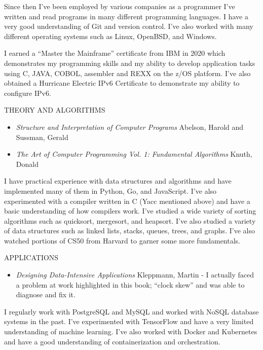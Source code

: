 \documentclass[12pt]{report}
\begin{document}
Since then I've been employed by various companies as a programmer I've written and read programs in many different programming languages. I have a very good understanding of Git and version control. I've also worked with many different operating systems such as Linux, OpenBSD, and Windows.\hfill \break 

I earned a ``Master the Mainframe'' certificate from IBM in 2020 which demonstrates my programming skills and my ability to develop application tasks using C, JAVA, COBOL, assembler and REXX on the z/OS platform. I've also obtained a Hurricane Electric IPv6 Certificate to demonstrate my ability to configure IPv6.\hfill \break

THEORY AND ALGORITHMS
\begin{itemize}
  \item \emph {Structure and Interpretation of Computer Programs} Abelson, Harold and Sussman, Gerald
  \item \emph {The Art of Computer Programming Vol. 1: Fundamental Algorithms} Knuth, Donald
\end{itemize}
I have practical experience with data structures and algorithms and have implemented many of them in Python, Go, and JavaScript. I've also experimented  with a compiler written in C (Yacc mentioned above) and have a basic understanding of how compilers work. I've studied a wide variety of sorting algorithms such as quicksort, mergesort, and heapsort. I've also studied a variety of data structures such as linked lists, stacks, queues, trees, and graphs. I've also watched portions of CS50 from Harvard to garner some more fundamentals.\hfill \break

APPLICATIONS
\begin{itemize}
  \item \emph {Designing Data-Intensive Applications} Kleppmann, Martin - I actually faced a problem at work highlighted in this book; ``clock skew'' and was able to diagnose and fix it.
\end{itemize}
I regularly work with PostgreSQL and MySQL and worked with NoSQL database systems in the past. I've experimented with TensorFlow and have a very limited understanding of machine learning. I've also worked with Docker and Kubernetes and have a good understanding of containerization and orchestration.\hfill \break
\end{document}
